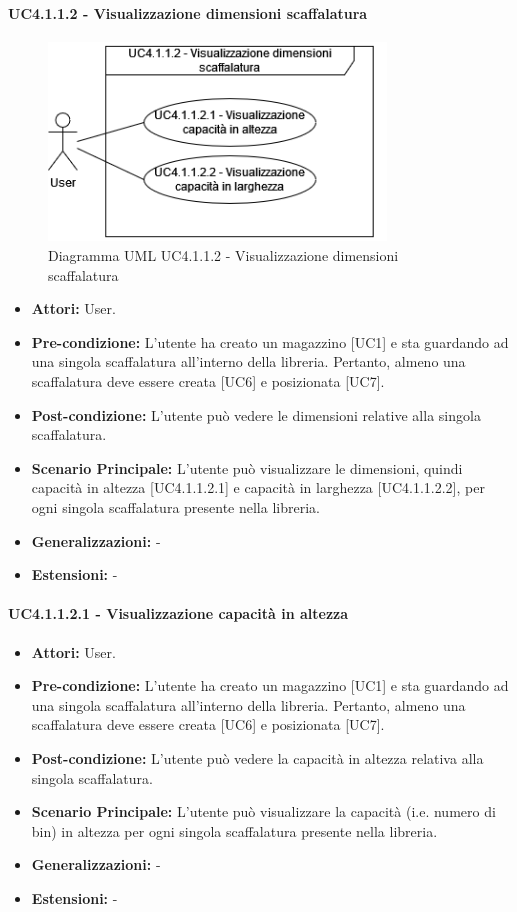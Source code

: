 \paragraph{UC4.1.1.2 - Visualizzazione dimensioni scaffalatura}
\begin{figure}[H]
  \centering
  \includegraphics[width=0.8\textwidth]{UC_diagrams_1-10/UC4.1.1.2.drawio.png}
   \caption{Diagramma UML UC4.1.1.2 - Visualizzazione dimensioni scaffalatura}
\end{figure}
\begin{itemize}
    \item \textbf{Attori:} User.
    \item \textbf{Pre-condizione:} L'utente ha creato un magazzino [UC1] e sta guardando ad una singola scaffalatura all'interno della libreria. Pertanto, almeno una scaffalatura deve essere creata [UC6] e posizionata [UC7].
    \item \textbf{Post-condizione:} L'utente può vedere le dimensioni relative alla singola scaffalatura.
    \item \textbf{Scenario Principale:} L'utente può visualizzare le dimensioni, quindi capacità in altezza [UC4.1.1.2.1] e capacità in larghezza [UC4.1.1.2.2], per ogni singola scaffalatura presente nella libreria.
    \item \textbf{Generalizzazioni:} -
    \item \textbf{Estensioni:} -
\end{itemize}


\paragraph{UC4.1.1.2.1 - Visualizzazione capacità in altezza}
\begin{itemize}
    \item \textbf{Attori:} User.
    \item \textbf{Pre-condizione:} L'utente ha creato un magazzino [UC1] e sta guardando ad una singola scaffalatura all'interno della libreria. Pertanto, almeno una scaffalatura deve essere creata [UC6] e posizionata [UC7].
    \item \textbf{Post-condizione:} L'utente può vedere la capacità in altezza relativa alla singola scaffalatura.
    \item \textbf{Scenario Principale:} L'utente può visualizzare la capacità (i.e. numero di bin) in altezza per ogni singola scaffalatura presente nella libreria.
    \item \textbf{Generalizzazioni:} -
    \item \textbf{Estensioni:} -
\end{itemize}


